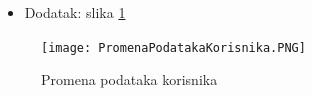 \documentclass[a4paper]{article}
\begin{document}
\begin{itemize}
\begin{enumerate}
                \begin{enumerate}
                    \item U 4. koraku osnovnog toka, sistem ispisuje poruku o grešci i obaveštava korisnika da podaci nisu uspešno izmenjeni.
                    \item Korisnik se vraća na korak 1. osnovnog toka.
                \end{enumerate}
        \end{enumerate}
        \item Dodatak: slika \ref{fig:promenapodkor}
\end{itemize}


\begin{figure}[hbt!]
    \centering
    \texttt{[image: PromenaPodatakaKorisnika.PNG]}
    \caption{Promena podataka korisnika \cite{smalkov} \cite{vparadigm}}
    \label{fig:promenapodkor}
\end{figure}
\end{document}
